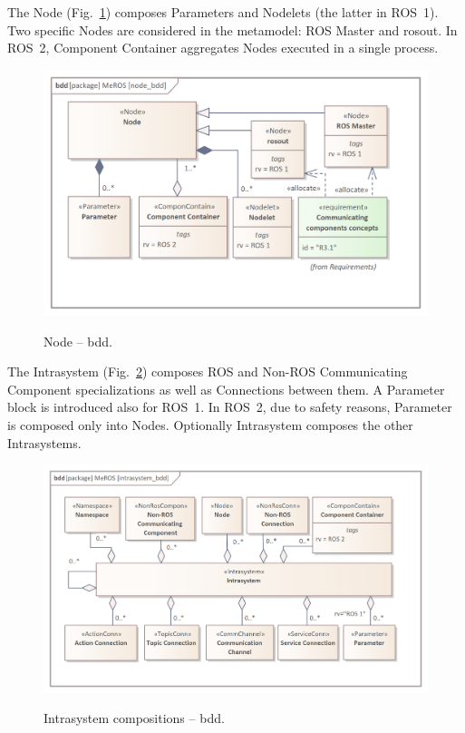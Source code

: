 \documentclass[11pt,oneside,a4paper]{article}
\begin{document}
 	The Node (Fig.~\ref{fig:node_bdd}) composes Parameters and Nodelets (the latter in ROS~1). Two specific Nodes are considered in the metamodel: ROS Master and rosout. In ROS~2, Component Container aggregates Nodes executed in a single process.
 	
	 
 	\begin{figure}[H]
	 	\centering
	 	\begin{center}
	 		{\includegraphics[scale=1.0]{img/meros_pkg/node_bdd.png}}
	 	\end{center}
	 	\caption{Node -- bdd.} 
		 	\label{fig:node_bdd}
	 \end{figure}
	 
	 \pagebreak
	 
	The Intrasystem (Fig.~\ref{fig:intrasystem_bdd}) composes ROS and Non-ROS Communicating Component specializations as well as Connections between them. A Parameter block is introduced also for ROS~1. In ROS~2, due to safety reasons, Parameter is composed only into Nodes. Optionally Intrasystem composes the other Intrasystems.
	

	\begin{figure}[H]
		\centering
		\begin{center}
			{\includegraphics[scale=1.0]{img/meros_pkg/intrasystem_bdd.png}}
		\end{center}
		\caption{Intrasystem compositions -- bdd.} 
		\label{fig:intrasystem_bdd}
	\end{figure} 
	 
\end{document}
